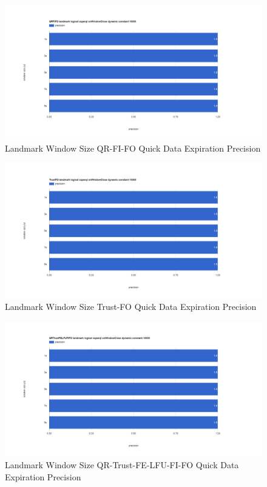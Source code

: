 \begin{figure}[!htbp]
	\centering
    \includegraphics[width=\textwidth]{img/app3-land-ws-qrfifo-quick-p.png}
    \caption{Landmark Window Size QR-FI-FO Quick Data Expiration Precision}
\end{figure}
\begin{figure}[!htbp]
	\centering
    \includegraphics[width=\textwidth]{img/app3-land-ws-trustfo-quick-p.png}
    \caption{Landmark Window Size Trust-FO Quick Data Expiration Precision}
\end{figure}
\begin{figure}[!htbp]
	\centering
    \includegraphics[width=\textwidth]{img/app3-land-ws-qrtrustfelfufifo-quick-p.png}
    \caption{Landmark Window Size QR-Trust-FE-LFU-FI-FO Quick Data Expiration Precision}
\end{figure}

